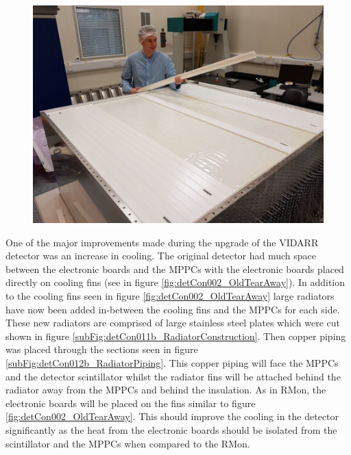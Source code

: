 \begin{figure}[!h]
\centering
\includegraphics[width=0.7\linewidth]{Chapter3/Figs/Raster/detCon006_RonInCleanRoom.png}
\label{fig:detCon006_RonInCleanRoom}
\end{figure}

One of the major improvements made during the upgrade of the VIDARR detector was an increase in cooling. The original detector had much space between the electronic boards and the MPPCs with the electronic boards placed directly on cooling fins (see in figure \ref{fig:detCon002_OldTearAway}). In addition to the cooling fins seen in figure \ref{fig:detCon002_OldTearAway} large radiators have now been added in-between the cooling fins and the MPPCs for each side. These new radiators are comprised of large stainless steel plates which were cut shown in figure \ref{subFig:detCon011b_RadiatorConstruction}. Then copper piping was placed through the sections seen in figure \ref{subFig:detCon012b_RadiatorPiping}. This copper piping will face the MPPCs and the detector scintillator whilst the radiator fins will be attached behind the radiator away from the MPPCs and behind the insulation. As in RMon, the electronic boards will be placed on the fins similar to figure \ref{fig:detCon002_OldTearAway}. This should improve the cooling in the detector significantly as the heat from the electronic boards should be isolated from the scintillator and the MPPCs when compared to the RMon. 

